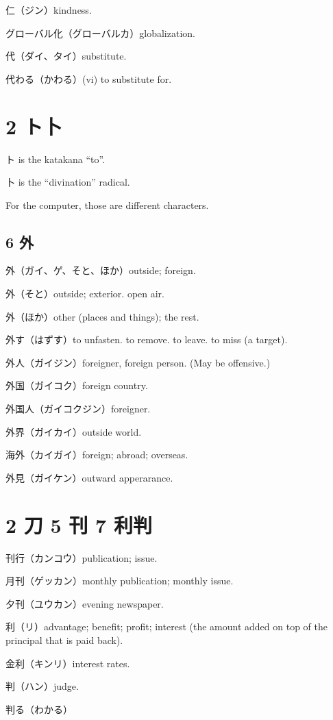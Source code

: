 仁（ジン）kindness.

グローバル化（グローバルカ）globalization.

代（ダイ、タイ）substitute.

代わる（かわる）(vi) to substitute for.

\section{2 ト卜}

ト is the katakana ``to''.

卜 is the ``divination'' radical.

For the computer, those are different characters.

\subsection{6 外}

外（ガイ、ゲ、そと、ほか）outside; foreign.

外（そと）outside; exterior. open air.

外（ほか）other (places and things); the rest.

外す（はずす）to unfasten. to remove. to leave. to miss (a target).

外人（ガイジン）foreigner, foreign person.
(May be offensive.)

外国（ガイコク）foreign country.

外国人（ガイコクジン）foreigner.

外界（ガイカイ）outside world.

海外（カイガイ）foreign; abroad; overseas.

外見（ガイケン）outward apperarance.

\section{2 刀 5 刊 7 利判}

刊行（カンコウ）publication; issue.

月刊（ゲッカン）monthly publication; monthly issue.

夕刊（ユウカン）evening newspaper.

利（リ）advantage; benefit; profit;
interest (the amount added on top of the principal that is paid back).

金利（キンリ）interest rates.

判（ハン）judge.

判る（わかる）

